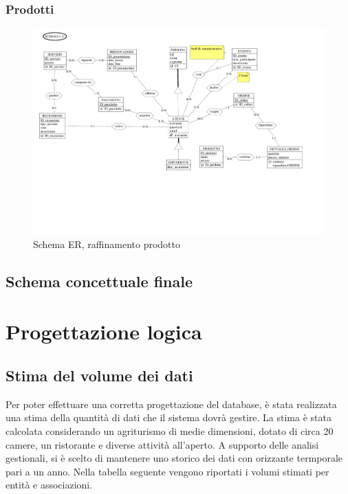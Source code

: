 \documentclass[a4paper,11pt]{report}
\begin{document}
\subsection{Prodotti}
\begin{figure}[H]
	\centering
	\includegraphics[width=\textwidth, trim=0 150pt 0 0, clip]{./pdf/raffinamento prodotto.pdf}
	\caption{Schema ER, raffinamento prodotto}
	\label{fig:raffinamento-prodotto}
\end{figure}

\section{Schema concettuale finale}

\chapter{Progettazione logica}
\section{Stima del volume dei dati}
Per poter effettuare una corretta progettazione del database, è stata realizzata una stima della quantità di dati che il sistema dovrà gestire. 
La stima è stata calcolata considerando un agriturismo di medie dimensioni, dotato di circa 20 camere, un ristorante e diverse attività all'aperto.
A supporto delle analisi gestionali, si è scelto di mantenere uno storico dei dati con orizzante termporale pari a un anno. 
Nella tabella seguente vengono riportati i volumi stimati per entità e associazioni.
\end{document}
